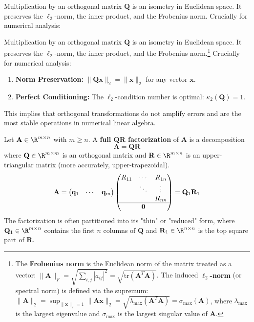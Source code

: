 \begin{proposition}
Multiplication by an orthogonal matrix $\mathbf{Q}$ is an isometry in Euclidean space. It preserves the $\ell_2$-norm, the inner product, and the Frobenius norm. Crucially for numerical analysis:
\begin{proposition}
Multiplication by an orthogonal matrix $\mathbf{Q}$ is an isometry in Euclidean space. It preserves the $\ell_2$-norm, the inner product, and the Frobenius norm.\footnote{The \textbf{Frobenius norm} is the Euclidean norm of the matrix treated as a vector: $\|\mathbf{A}\|_F = \sqrt{\sum_{i,j} |a_{ij}|^2} = \sqrt{\text{tr}(\mathbf{A}^T\mathbf{A})}$. The induced \textbf{$\ell_2$-norm} (or spectral norm) is defined via the supremum: $\|\mathbf{A}\|_2 = \sup_{\|\mathbf{x}\|_2=1} \|\mathbf{A}\mathbf{x}\|_2 = \sqrt{\lambda_{\max}(\mathbf{A}^T\mathbf{A})} = \sigma_{\max}(\mathbf{A})$, where $\lambda_{\max}$ is the largest eigenvalue and $\sigma_{\max}$ is the largest singular value of $\mathbf{A}$.} Crucially for numerical analysis:
\begin{enumerate}
    \item \textbf{Norm Preservation:} $\|\mathbf{Q}\mathbf{x}\|_2 = \|\mathbf{x}\|_2$ for any vector $\mathbf{x}$.
    \item \textbf{Perfect Conditioning:} The $\ell_2$-condition number is optimal: $\kappa_2(\mathbf{Q}) = 1$.
\end{enumerate}
This implies that orthogonal transformations do not amplify errors and are the most stable operations in numerical linear algebra.
\end{proposition}

\begin{definition}
Let $\mathbf{A} \in \R^{m \times n}$ with $m \ge n$. A \textbf{full QR factorization} of $\mathbf{A}$ is a decomposition
\[ \mathbf{A} = \mathbf{Q}\mathbf{R} \]
where $\mathbf{Q} \in \R^{m \times m}$ is an orthogonal matrix and $\mathbf{R} \in \R^{m \times n}$ is an upper-triangular matrix (more accurately, upper-trapezoidal).
\[ \mathbf{A} = \begin{pmatrix} \mathbf{q}_1 & \cdots & \mathbf{q}_m \end{pmatrix} 
   \begin{pmatrix} R_{11} & \cdots & R_{1n} \\ & \ddots & \vdots \\ & & R_{nn} \\ \hline & \mathbf{0} & \end{pmatrix}
   = \mathbf{Q}_1 \mathbf{R}_1
\]
The factorization is often partitioned into its "thin" or "reduced" form, where $\mathbf{Q}_1 \in \R^{m \times n}$ contains the first $n$ columns of $\mathbf{Q}$ and $\mathbf{R}_1 \in \R^{n \times n}$ is the top square part of $\mathbf{R}$.
\end{definition}


\end{proposition}
